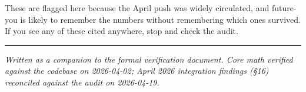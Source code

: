 \documentclass[12pt,a4paper]{article}
\begin{document}
These are flagged here because the April push was widely circulated,
and future-you is likely to remember the numbers without remembering
which ones survived. If you see any of these cited anywhere,
stop and check the audit.

\vspace{2em}
\hrule
\vspace{0.5em}
{\small\textit{Written as a companion to the formal verification document. Core math verified against the codebase on 2026-04-02; April 2026 integration findings (§16) reconciled against the audit on 2026-04-19.}}
\end{document}
